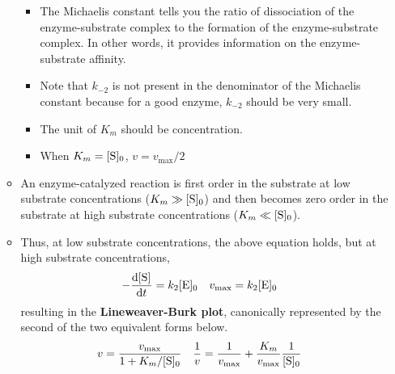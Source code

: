 \documentclass[../notes.tex]{subfiles}
\begin{document}
\begin{itemize}
\begin{itemize}
        \begin{itemize}
            \item The Michaelis constant tells you the ratio of dissociation of the enzyme-substrate complex to the formation of the enzyme-substrate complex. In other words, it provides information on the enzyme-substrate affinity.
            \item Note that $k_{-2}$ is not present in the denominator of the Michaelis constant because for a good enzyme, $k_{-2}$ should be very small.
            \item The unit of $K_m$ should be concentration.
            \item When $K_m=\cnc[0]{S}$, $v=v_\text{max}/2$
        \end{itemize}
        \item An enzyme-catalyzed reaction is first order in the substrate at low substrate concentrations ($K_m\gg\cnc[0]{S}$) and then becomes zero order in the substrate at high substrate concentrations ($K_m\ll\cnc[0]{S}$).
        \item Thus, at low substrate concentrations, the above equation holds, but at high substrate concentrations,
        \begin{align*}
            -\dv{\cnc{S}}{t} &= k_2\cnc[0]{E}&
            v_\text{max} &= k_2\cnc[0]{E}
        \end{align*}
        resulting in the \textbf{Lineweaver-Burk plot}, canonically represented by the second of the two equivalent forms below.
        \begin{align*}
            v &= \frac{v_\text{max}}{1+K_m/\cnc[0]{S}}&
            \frac{1}{v} &= \frac{1}{v_\text{max}}+\frac{K_m}{v_\text{max}}\frac{1}{\cnc[0]{S}}
        \end{align*}
    \end{itemize}
\end{itemize}
\end{document}
